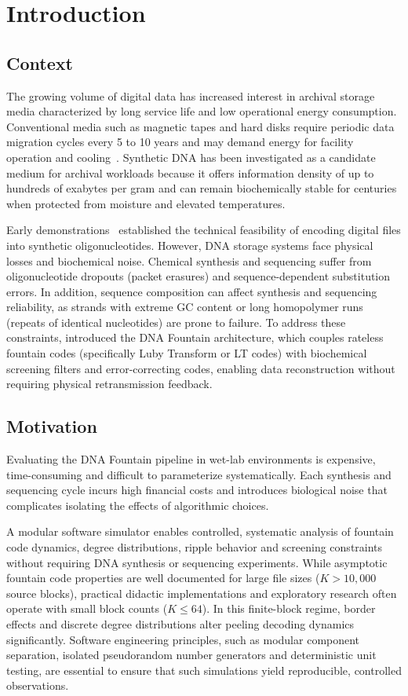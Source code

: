 \chapter{Introduction}
\label{chap:introduction}

\section{Context}
The growing volume of digital data has increased interest in archival storage media characterized by long service life and low operational energy consumption. Conventional media such as magnetic tapes and hard disks require periodic data migration cycles every 5 to 10 years and may demand energy for facility operation and cooling~\cite{ceze2019}. Synthetic DNA has been investigated as a candidate medium for archival workloads because it offers information density of up to hundreds of exabytes per gram and can remain biochemically stable for centuries when protected from moisture and elevated temperatures.

Early demonstrations~\cite{davis1996, church2012} established the technical feasibility of encoding digital files into synthetic oligonucleotides. However, DNA storage systems face physical losses and biochemical noise. Chemical synthesis and sequencing suffer from oligonucleotide dropouts (packet erasures) and sequence-dependent substitution errors. In addition, sequence composition can affect synthesis and sequencing reliability, as strands with extreme GC content or long homopolymer runs (repeats of identical nucleotides) are prone to failure. To address these constraints,  introduced the DNA Fountain architecture, which couples rateless fountain codes (specifically Luby Transform or LT codes) with biochemical screening filters and error-correcting codes, enabling data reconstruction without requiring physical retransmission feedback.

\section{Motivation}
Evaluating the DNA Fountain pipeline in wet-lab environments is expensive, time-consuming and difficult to parameterize systematically. Each synthesis and sequencing cycle incurs high financial costs and introduces biological noise that complicates isolating the effects of algorithmic choices.

A modular software simulator enables controlled, systematic analysis of fountain code dynamics, degree distributions, ripple behavior and screening constraints without requiring DNA synthesis or sequencing experiments. While asymptotic fountain code properties are well documented for large file sizes ($K > 10{,}000$ source blocks), practical didactic implementations and exploratory research often operate with small block counts ($K \le 64$). In this finite-block regime, border effects and discrete degree distributions alter peeling decoding dynamics significantly. Software engineering principles, such as modular component separation, isolated pseudorandom number generators and deterministic unit testing, are essential to ensure that such simulations yield reproducible, controlled observations.

